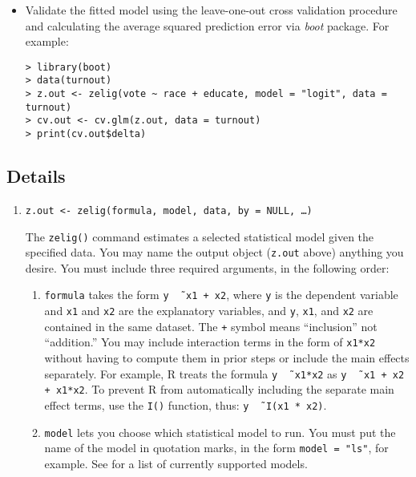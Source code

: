 \begin{itemize}
\item Validate the fitted model using the leave-one-out cross
  validation procedure and calculating the average squared prediction
  error via {\it boot} package.  For example:
\begin{verbatim}
> library(boot)
> data(turnout)
> z.out <- zelig(vote ~ race + educate, model = "logit", data = turnout)
> cv.out <- cv.glm(z.out, data = turnout)
> print(cv.out$delta)
\end{verbatim}

\end{itemize}

\subsection{Details}

\begin{enumerate}
\item {\tt z.out <- zelig(formula, model, data, by = NULL, \dots)}
 
  The {\tt zelig()} command estimates a selected statistical model
  given the specified data.  You may name the output object
  (\texttt{z.out} above) anything you desire.  You must include three
  required arguments, in the following order:

  \begin{enumerate}

  \item \texttt{formula} takes the form {\tt y \~\, x1 + x2}, where
    {\tt y} is the dependent variable and {\tt x1} and {\tt x2} are
    the explanatory variables, and {\tt y}, {\tt x1}, and {\tt x2} are
    contained in the same dataset.  The {\tt +} symbol means
    ``inclusion'' not ``addition.''  You may include interaction terms
    in the form of {\tt x1*x2} without having to compute them in prior
    steps or include the main effects separately.  For example, R
    treats the formula {\tt y \~\, x1*x2} as {\tt y \~\, x1 + x2 +
      x1*x2}.  To prevent R from automatically including the separate
    main effect terms, use the {\tt I()} function, thus: {\tt y \~\,
      I(x1 * x2)}.

  \item \texttt{model} lets you choose which statistical model to run.
    You must put the name of the model in quotation marks, in the form
    {\tt model = "ls"}, for example.  See  for a list
    of currently supported models.


\end{enumerate}
\end{enumerate}
